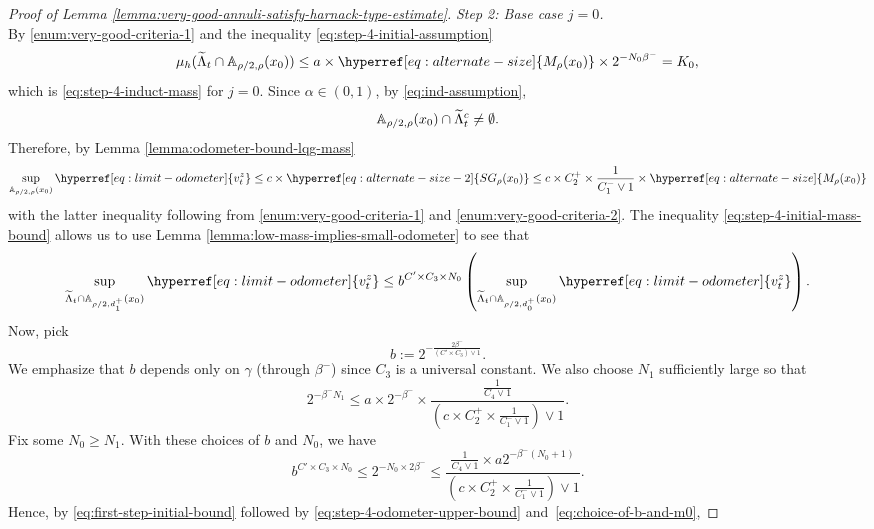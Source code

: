 \documentclass[12pt]{amsart}
\numberwithin{equation}{section}
\newcommand{\odometer}[2]{\hyperref[eq:limit-odometer]{v^{#1}_{#2}}}
\newcommand{\Mrho}[2]{\hyperref[eq:alternate-size]{M_{#1}(#2)}}
\newcommand{\SGrho}[2]{\hyperref[eq:alternate-size-2]{SG_{#1}(#2)}}
\begin{document}
\begin{proof}[Proof of Lemma \ref{lemma:very-good-annuli-satisfy-harnack-type-estimate}]
		{\it Step 2: Base case $j = 0$.} \\
		By \ref{enum:very-good-criteria-1} and the inequality \eqref{eq:step-4-initial-assumption} 
		\begin{equation} \label{eq:step-4-initial-mass-bound}
		\mu_h(\widetilde \Lambda_t \cap \A_{\rho/2, \rho}(x_0)) \leq a \times \Mrho{\rho}{x_0} \times 2^{-N_0 \beta^-}  = K_0,
		\end{equation}
		which is \eqref{eq:step-4-induct-mass} for $j = 0$.
		Since $\alpha \in (0,1)$, by \eqref{eq:ind-assumption},
		\[
		\mathbb{A}_{\rho/2, \rho}(x_0) \cap \widetilde{\Lambda}_t^c \neq \emptyset.
		\]
		Therefore, by Lemma 
		\ref{lemma:odometer-bound-lqg-mass}
		\begin{equation} \label{eq:step-4-odometer-upper-bound}
		\sup_{\A_{\rho/2, \rho}(x_0)} \odometer{z}{t} \leq c \times \SGrho{\rho}{x_0} 	\leq c \times C^+_2 \times \frac{1}{C^-_1 \vee 1} \times \Mrho{\rho}{x_0} 
		\end{equation}
		with the latter inequality following from \ref{enum:very-good-criteria-1} and \ref{enum:very-good-criteria-2}. The inequality \eqref{eq:step-4-initial-mass-bound} allows us to use Lemma \ref{lemma:low-mass-implies-small-odometer}
		to see that 
		\begin{equation} \label{eq:first-step-initial-bound}
		\sup_{\widetilde \Lambda_t \cap \A_{\rho/2, d^+_{1}}(x_0)} \odometer{z}{t} \leq b^{C' \times C_3 \times N_0} \left(	\sup_{\widetilde \Lambda_t \cap \A_{\rho/2, d^+_{0}}(x_0)} \odometer{z}{t} \right).
		\end{equation}
		Now, pick  
		\begin{equation} \label{eq:choice-of-b}
		b := 2^{-\frac{2 \beta^-}{(C' \times C_3) \vee 1}}  .
		\end{equation}
		We emphasize that $b$ depends only on $\gamma$ (through $\beta^-$) since $C_3$ is a universal constant.
		We also choose $N_1$ sufficiently large so that
		\begin{equation} \label{eq:choice-of-N1}
		2^{-\beta^- N_1} \leq a \times 2^{-\beta^-} \times \frac{\frac{1}{C_4 \vee 1}}{(c \times C^+_2 \times \frac{1}{C^-_1 \vee 1}) \vee 1}.
		\end{equation}
		Fix some $N_0 \geq N_1$. With these choices of $b$ and $N_0$, we have 
		\begin{equation} \label{eq:choice-of-b-and-m0}
		b^{C' \times C_3 \times N_0} \leq 
		2^{-N_0 \times 2 \beta^-} \leq
		\frac{ \frac{1}{C_4 \vee 1} \times a 2^{-\beta^-(N_0+1)}}{(c \times C^+_2 \times \frac{1}{C^-_1 \vee 1}) \vee 1}.
		\end{equation}
		Hence, by \eqref{eq:first-step-initial-bound} followed by \eqref{eq:step-4-odometer-upper-bound} and~\eqref{eq:choice-of-b-and-m0}, 
		

\end{proof}
\end{document}
